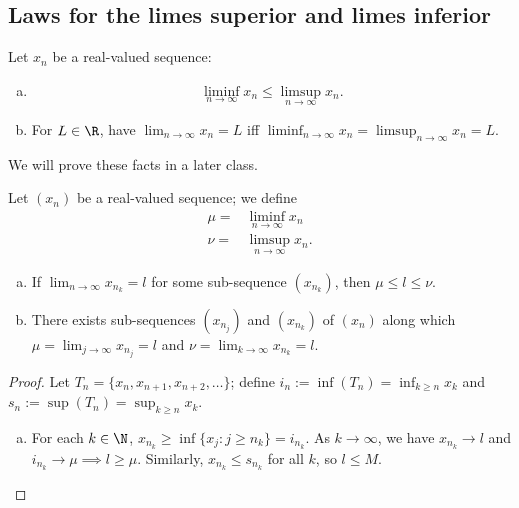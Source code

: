 \subsection{Laws for the limes superior and limes inferior}
Let \(x_n\) be a real-valued sequence:
\begin{enumerate}[(a)]
	\item 
	\begin{equation*}
		\liminf_{n\to\infty}x_n\leq \limsup_{n\to\infty}x_n.
	\end{equation*}
	
	\item For \(L\in\R\), have \(\displaystyle\lim_{n\to\infty}x_n=L\) iff \(\displaystyle\liminf_{n\to\infty}x_n=\displaystyle\limsup_{n\to\infty}x_n=L\).
\end{enumerate}
We will prove these facts in a later class.

\begin{proposition}
	Let \((x_n)\) be a real-valued sequence; we define 
	\begin{align*}
		\mu=&\liminf_{n\to\infty}x_n\\
		\nu=&\limsup_{n\to\infty}x_n.
	\end{align*}
	\begin{enumerate}[(a)]
		\item If \(\displaystyle\lim_{n\to\infty}x_{n_k}=l\) for some sub-sequence \((x_{n_k})\), then \(\mu\leq l\leq \nu\).
		
		\item There exists sub-sequences \((x_{n_j})\) and \((x_{n_k})\) of \((x_n)\) along which \(\mu=\displaystyle\lim_{j\to\infty}x_{n_j}=l\) and \(\nu=\displaystyle\lim_{k\to\infty}x_{n_k}=l\).
	\end{enumerate}
\end{proposition}

\begin{proof}
	Let \(T_n=\{x_n,x_{n+1},x_{n+2},\dots\}\); define \(i_n:=\inf(T_n)=\displaystyle\inf_{k\geq n}x_k\) and \(s_n:=\sup(T_n)=\displaystyle\sup_{k\geq n}x_k\).
	\begin{enumerate}[(a)]
		\item For each \(k\in\N\), \(x_{n_k}\geq \inf\{x_j:j\geq n_k\}=i_{n_k}\). As \(k\to\infty\), we have \(x_{n_k}\to l\) and \(i_{n_k}\to \mu\implies l\geq \mu\). Similarly, \(x_{n_k}\leq s_{n_k}\) for all \(k\), so \(l\leq M\).
	\end{enumerate}
\end{proof}